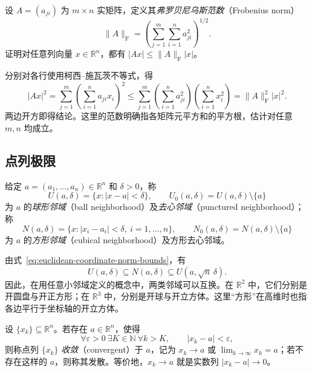 \documentclass[UTF8,12pt,a4paper,fontset=fandol]{ctexbook}
\begin{document}
\begin{example}
\label{ex:matrix-frobenius-vector-bound}
设 $A=(a_{ji})$ 为 $m\times n$ 实矩阵，定义其\emph{弗罗贝尼乌斯范数}（Frobenius norm）
\[
    \|A\|_{\mathrm F}=\left(\sum_{j=1}^m\sum_{i=1}^n a_{ji}^2\right)^{1/2}.
\]
证明对任意列向量 $x\in\mathbb R^n$，都有 $|Ax|\leq\|A\|_{\mathrm F}|x|$。
\end{example}

\begin{solve}
分别对各行使用柯西--施瓦茨不等式，得
\[
    |Ax|^2=\sum_{j=1}^m\left(\sum_{i=1}^n a_{ji}x_i\right)^2
    \leq\sum_{j=1}^m\left(\sum_{i=1}^n a_{ji}^2\right)
                            \left(\sum_{i=1}^n x_i^2\right)
    =\|A\|_{\mathrm F}^2|x|^2.
\]
两边开方即得结论。这里的范数明确指各矩阵元平方和的平方根，估计对任意 $m,n$ 均成立。
\end{solve}

\subsection{点列极限}
\label{subsec:limits-of-point-sequences}

\begin{definition}
\label{def:euclidean-neighborhoods}
给定 $a=(a_1,\ldots,a_n)\in\mathbb R^n$ 和 $\delta>0$，称
\[
    U(a,\delta)=\{x:|x-a|<\delta\},\qquad
    U_0(a,\delta)=U(a,\delta)\setminus\{a\}
\]
为 $a$ 的\emph{球形邻域}（ball neighborhood）及\emph{去心邻域}（punctured neighborhood）；称
\[
    N(a,\delta)=\{x:|x_i-a_i|<\delta,\ i=1,\ldots,n\},\qquad
    N_0(a,\delta)=N(a,\delta)\setminus\{a\}
\]
为 $a$ 的\emph{方形邻域}（cubical neighborhood）及方形去心邻域。
\end{definition}

由式~\eqref{eq:euclidean-coordinate-norm-bounds}，有
\begin{equation}
    U(a,\delta)\subseteq N(a,\delta)\subseteq U(a,\sqrt n\,\delta).
    \label{eq:ball-cube-neighborhood-inclusions}
\end{equation}
因此，在用任意小邻域定义的概念中，两类邻域可以互换。在 $\mathbb R^2$ 中，它们分别是开圆盘与开正方形；在 $\mathbb R^3$ 中，分别是开球与开立方体。这里“方形”在高维时也指各边平行于坐标轴的开立方体。

\begin{definition}
\label{def:convergent-euclidean-sequence}
设 $\{x_k\}\subseteq\mathbb R^n$。若存在 $a\in\mathbb R^n$，使得
\[
    \forall\varepsilon>0\ \exists K\in\mathbb N\ \forall k>K,
    \qquad |x_k-a|<\varepsilon,
\]
则称点列 $\{x_k\}$ \emph{收敛}（convergent）于 $a$，记为 $x_k\to a$ 或 $\lim_{k\to\infty}x_k=a$；若不存在这样的 $a$，则称其发散。等价地，$x_k\to a$ 就是实数列 $|x_k-a|\to0$。
\end{definition}
\end{document}
